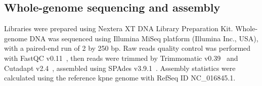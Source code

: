 \subsection{Whole-genome sequencing and assembly}\label{subsec:proc_raw}
Libraries were prepared using Nextera XT DNA Library Preparation Kit.
Whole-genome DNA was sequenced using Illumina MiSeq platform (Illumina Inc., USA),
with a paired-end run of 2 by 250 bp.
Raw reads quality control was performed with FastQC v0.11~\cite{FastQC},  %
then reads were trimmed by Trimmomatic v0.39~\cite{Trimmomatic}
and Cutadapt v2.4~\cite{Cutadapt},
assembled using SPAdes v3.9.1~\cite{SPAdes}.
Assembly statistics were calculated using the reference \gls{kpne} genome with RefSeq ID NC\_016845.1.

